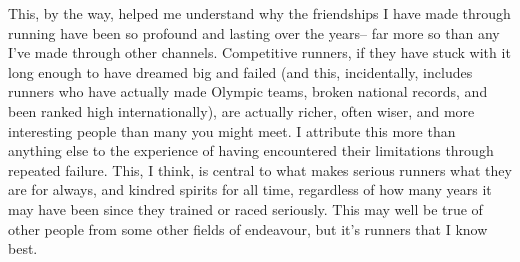 This, by the way, helped me understand why the friendships I have made through running have been so profound and lasting over the years-- far more so than any I've made through other channels. Competitive runners, if they have stuck with it long enough to have dreamed big and failed (and this, incidentally, includes runners who have actually made Olympic teams, broken national records, and been ranked high internationally), are actually richer, often wiser, and more interesting people than many you might meet. I attribute this more than anything else to the experience of having encountered their limitations through repeated failure. This, I think, is central to what makes serious runners what they are for always, and kindred spirits for all time, regardless of how many years it may have been since they trained or raced seriously. This may well be true of other people from some other fields of endeavour, but it's runners that I know best.




